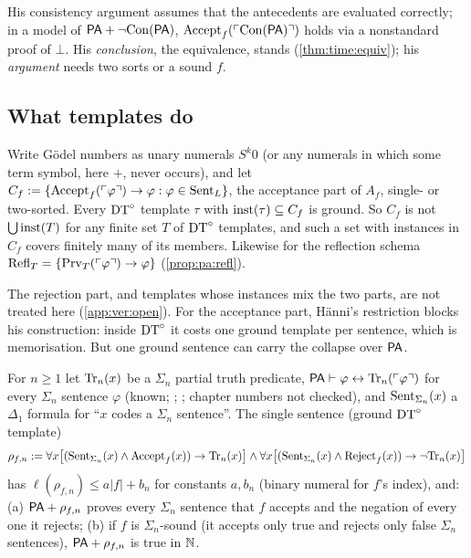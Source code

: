 His consistency argument assumes that the antecedents are evaluated correctly; in a model of $\mathsf{PA}+\neg\mathrm{Con}(\mathsf{PA})$, $\mathrm{Accept}_{f}(\ulcorner \mathrm{Con}(\mathsf{PA})\urcorner)$ holds via a nonstandard proof of $\bot$. His \emph{conclusion}, the equivalence, stands (\cref{thm:time:equiv}); his \emph{argument} needs two sorts or a sound $f$.

\subsection{What templates do}\label{sec:time:templates}

\begin{proposition}\label{prop:time:notemplate}
Write Gödel numbers as unary numerals $S^k0$ (or any numerals in which some term symbol, here $+$, never occurs), and let $C_f:=\{\mathrm{Accept}_{f}(\ulcorner \varphi\urcorner)\to\varphi:\varphi\in\mathrm{Sent}_L\}$, the acceptance part of $A_f$, single- or two-sorted. Every $\mathrm{DT}^{\circ}$ template $\tau$ with $\mathrm{inst}(\tau)\subseteq C_f$ is ground. So $C_f$ is not $\bigcup\mathrm{inst}(T)$ for any finite set $T$ of $\mathrm{DT}^{\circ}$ templates, and such a set with instances in $C_f$ covers finitely many of its members. Likewise for the reflection schema $\mathrm{Refl}_T=\{\mathrm{Prv}_T(\ulcorner \varphi\urcorner)\to\varphi\}$ (\cref{prop:pa:refl}).
\end{proposition}

\noindent The rejection part, and templates whose instances mix the two parts, are not treated here (\cref{app:ver:open}). For the acceptance part, H\"anni's restriction blocks his construction: inside $\mathrm{DT}^{\circ}$ it costs one ground template per sentence, which is memorisation. But one ground sentence can carry the collapse over $\mathsf{PA}$.

\begin{proposition}\label{prop:time:collapse}
For $n\ge1$ let $\mathrm{Tr}_n(x)$ be a $\Sigma_n$ partial truth predicate, $\mathsf{PA}\vdash\varphi\leftrightarrow\mathrm{Tr}_n(\ulcorner \varphi\urcorner)$ for every $\Sigma_n$ sentence $\varphi$ (known; \citealp[Ch.~I]{hajek1993metamathematics}; \citealp[Ch.~9]{kaye1991models}; chapter numbers not checked), and $\mathrm{Sent}_{\Sigma_n}(x)$ a $\Delta_1$ formula for ``$x$ codes a $\Sigma_n$ sentence''. The single sentence (ground $\mathrm{DT}^{\circ}$ template)
\[
\rho_{f,n}:=\forall x\big[(\mathrm{Sent}_{\Sigma_n}(x)\wedge\mathrm{Accept}_{f}(x))\to\mathrm{Tr}_n(x)\big]\wedge\forall x\big[(\mathrm{Sent}_{\Sigma_n}(x)\wedge\mathrm{Reject}_{f}(x))\to\neg\mathrm{Tr}_n(x)\big]
\]
has $\ell(\rho_{f,n})\le a|f|+b_n$ for constants $a,b_n$ (binary numeral for $f$'s index), and:
(a) $\mathsf{PA}+\rho_{f,n}$ proves every $\Sigma_n$ sentence that $f$ accepts and the negation of every one it rejects;
(b) if $f$ is $\Sigma_n$-sound (it accepts only true and rejects only false $\Sigma_n$ sentences), $\mathsf{PA}+\rho_{f,n}$ is true in $\mathbb{N}$.
\end{proposition}


